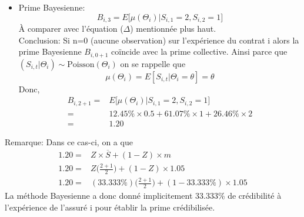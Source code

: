 \documentclass[11pt,french]{report}
\begin{document}
\begin{itemize}
\begin{align*}
\begin{array}{rl}
      12.45 \% &, \Theta = 0.5 \\
      61.07 \% &, \Theta = 1 \\
      26.46\% &, \Theta = 2 \\
     \end{array}
     \right. \\
\end{align*}
\item[2)] Prime Bayesienne:
\begin{equation}
B_{i,3} = E \Big[ \mu(\Theta_i) | S_{i,1} = 2, S_{i,2} = 1\Big]
\end{equation}
À comparer avec l'équation ($\Delta$) mentionnée plus haut.\\

Conclusion: Si n=0 (aucune observation) sur l'expérience du contrat i alors la prime Bayesienne $B_{i, 0 + 1}$ coïncide avec la prime collective.
Ainsi parce que $(S_{i,t}|\Theta_i) \sim \text{Poisson}(\Theta_i) $ on se rappelle que $$\mu(\Theta_i) = E[S_{i,t}|\Theta_i = \theta] = \theta$$
Donc,
\begin{align*}
B_{i,2+1} =& E \Big[ \mu(\Theta_i) | S_{i,1} = 2, S_{i,2} = 1\Big] \\
=& 12.45 \% \times 0.5 + 61.07\% \times 1 + 26.46 \% \times 2 \\
=& 1.20
\end{align*}
\end{itemize}
Remarque: Dans ce cas-ci, on a que
\begin{align*}
1.20 =& Z \times \overline{S} + (1 - Z) \times m \\
1.20 =& Z \Big(\frac{2 + 1}{2} \Big) + (1 - Z) \times 1.05 \\
1.20 =& (33.333 \%) \Big(\frac{2 + 1}{2} \Big) + (1 - 33.333\%) \times 1.05
\end{align*}
La méthode Bayesienne a donc donné implicitement 33.333\% de crédibilité à l'expérience de l'assuré i pour établir la prime crédibilisée.
\end{document}
